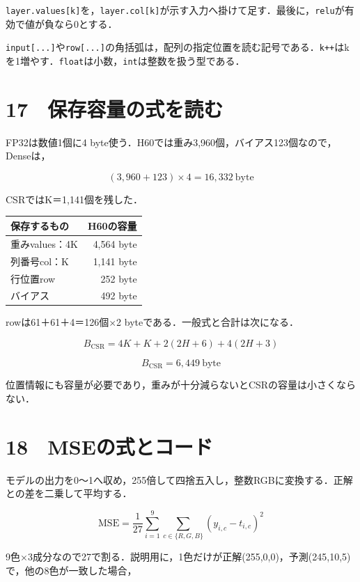 \documentclass[
  14pt,
  a5paper,
]{extarticle}
\begin{document}
\texttt{layer.values{[}k{]}}を，\texttt{layer.col{[}k{]}}が示す入力へ掛けて足す．最後に，\texttt{relu}が有効で値が負なら0とする．

\texttt{input{[}...{]}}や\texttt{row{[}...{]}}の角括弧は，配列の指定位置を読む記号である．\texttt{k++}はkを1増やす．\texttt{float}は小数，\texttt{int}は整数を扱う型である．

\newpage

\section{17　保存容量の式を読む}\label{ux4fddux5b58ux5bb9ux91cfux306eux5f0fux3092ux8aadux3080}

FP32は数値1個に4
byte使う．H60では重み3,960個，バイアス123個なので，Denseは，

\[(3,960+123)\times4=16,332\ \text{byte}\]

CSRではK＝1,141個を残した．

\begin{longtable}[]{@{}lr@{}}
\toprule\noalign{}
保存するもの & H60の容量 \\
\midrule\noalign{}
\endhead
\bottomrule\noalign{}
\endlastfoot
重みvalues：4K & 4,564 byte \\
列番号col：K & 1,141 byte \\
行位置row & 252 byte \\
バイアス & 492 byte \\
\end{longtable}

rowは61＋61＋4＝126個×2 byteである．一般式と合計は次になる．

\[B_{\mathrm{CSR}}=4K+K+2(2H+6)+4(2H+3)\]

\[B_{\mathrm{CSR}}=6,449\ \text{byte}\]

位置情報にも容量が必要であり，重みが十分減らないとCSRの容量は小さくならない．

\newpage

\section{18　MSEの式とコード}\label{mseux306eux5f0fux3068ux30b3ux30fcux30c9}

モデルの出力を0〜1へ収め，255倍して四捨五入し，整数RGBに変換する．正解との差を二乗して平均する．

\[\mathrm{MSE}=\frac1{27}\sum_{i=1}^{9}\sum_{c\in\{R,G,B\}}(y_{i,c}-t_{i,c})^2\]

9色×3成分なので27で割る．説明用に，1色だけが正解(255,0,0)，予測(245,10,5)で，他の8色が一致した場合，
\end{document}
